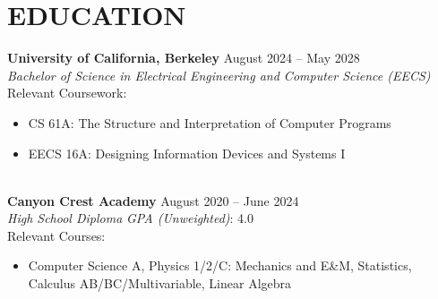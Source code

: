 \section*{EDUCATION}
\noindent
\textbf{University of California, Berkeley} \hfill August 2024 -- May 2028 \\
\textit{Bachelor of Science in Electrical Engineering and Computer Science (EECS)} \\
\noindent
Relevant Coursework:
\begin{itemize}
	\item CS 61A: The Structure and Interpretation of Computer Programs
	\item EECS 16A: Designing Information Devices and Systems I
\end{itemize}

\noindent
\\\textbf{Canyon Crest Academy} \hfill August 2020 -- June 2024 \\
\textit{High School Diploma} \hfill \textit{GPA (Unweighted)}: 4.0 \\
\noindent
Relevant Courses:
\begin{itemize}
	\item Computer Science A, Physics 1/2/C: Mechanics and E\&M, Statistics, Calculus AB/BC/Multivariable, Linear Algebra
\end{itemize}
